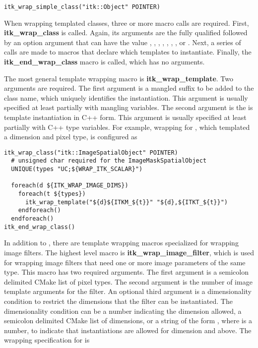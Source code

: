 \begin{verbatim}
itk_wrap_simple_class("itk::Object" POINTER)
\end{verbatim}

When wrapping templated classes, three or more macro calls are required.
First, \textbf{itk\_wrap\_class} is called.  Again, its arguments are the
fully qualified followed by an option argument that can have the value
, ,
, ,
,
, , or
. Next, a series of calls are made to macros that declare
which templates to instantiate. Finally, the \textbf{itk\_end\_wrap\_class}
macro is called, which has no arguments.

The most general template wrapping macro is \textbf{itk\_wrap\_template}. Two
arguments are required. The first argument is a mangled suffix to be added to
the class name, which uniquely identifies the instantiation. This argument is usually
specified at least partially with  mangling
variables. The second argument is the is template instantiation in C++ form.
This argument is usually specified at least partially with 
C++ type variables. For example, wrapping for
, which templated a dimension and pixel type, is
configured as

\begin{verbatim}
itk_wrap_class("itk::ImageSpatialObject" POINTER)
  # unsigned char required for the ImageMaskSpatialObject
  UNIQUE(types "UC;${WRAP_ITK_SCALAR}")

  foreach(d ${ITK_WRAP_IMAGE_DIMS})
    foreach(t ${types})
      itk_wrap_template("${d}${ITKM_${t}}" "${d},${ITKT_${t}}")
    endforeach()
  endforeach()
itk_end_wrap_class()
\end{verbatim}


In addition to , there are template wrapping macros
specialized for wrapping image filters. The highest level macro is
\textbf{itk\_wrap\_image\_filter}, which is used for wrapping image filters
that need one or more image parameters of the same type. This macro has two
required arguments. The first argument is a semicolon delimited CMake list of
pixel types. The second argument is the number of image template arguments for
the filter. An optional third argument is a dimensionality condition to
restrict the dimensions that the filter can be instantiated. The
dimensionality condition can be a number indicating the dimension
allowed, a semicolon delimited CMake list of dimensions, or a string of the
form , where  is a number, to indicate that instantiations
are allowed for dimension  and above. The wrapping specification for
 is

